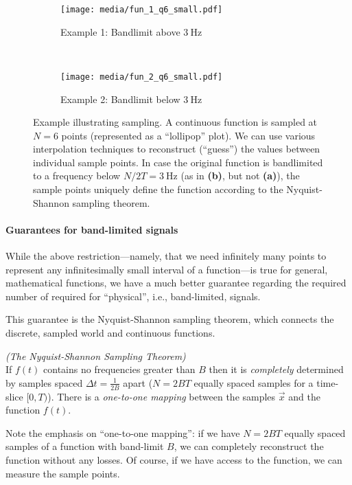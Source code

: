 \documentclass[10pt,letterpaper,oneside]{article}
\begin{document}
\begin{figure}
	\begin{subfigure}{\textwidth}
		\centering
		\texttt{[image: media/fun\_1\_q6\_small.pdf]}
		\caption{Example 1: Bandlimit above $\SI{3}{\hertz}$}
	\end{subfigure}\\[0.5cm]
	\begin{subfigure}{\textwidth}
		\centering
		\texttt{[image: media/fun\_2\_q6\_small.pdf]}
		\caption{Example 2: Bandlimit below $\SI{3}{\hertz}$}
	\end{subfigure}		
	\caption{Example illustrating sampling. A continuous function is sampled at $N = 6$ points (represented as a \enquote{lollipop} plot). We can use various interpolation techniques to reconstruct (\enquote{guess}) the values between individual sample points. In case the original function is bandlimited to a frequency below $N / {2T} = \SI{3}{\hertz}$ (as in \textbf{(b)}, but not \textbf{(a)}), the sample points uniquely define the function according to the Nyquist-Shannon sampling theorem.}
	\label{fig:sampling}
\end{figure}



\newpage

\paragraph{Guarantees for band-limited signals}
While the above restriction---namely, that we need infinitely many points to represent any infinitesimally small interval of a function---is true for general, mathematical functions, we have a much better guarantee regarding the required number of required for \enquote{physical}, i.e., band-limited, signals.

This guarantee is the Nyquist-Shannon sampling theorem, which connects the discrete, sampled world and continuous functions.
\begin{mdframed}
	\hfill\emph{(The Nyquist-Shannon Sampling Theorem)}\\
	If $f(t)$ contains no frequencies greater than $B$ then it is \emph{completely} determined by samples spaced $\Delta t = \frac{1}{2B}$ apart ($N = 2BT$ equally spaced samples for a time-slice $[0, T)$). There is a \emph{one-to-one mapping} between the samples $\vec x$ and the function $f(t)$.
\end{mdframed}
Note the emphasis on \enquote{one-to-one mapping}: if we have $N = 2BT$ equally spaced samples of a function with band-limit $B$, we can completely reconstruct the function without any losses. Of course, if we have access to the function, we can measure the sample points.
\end{document}

